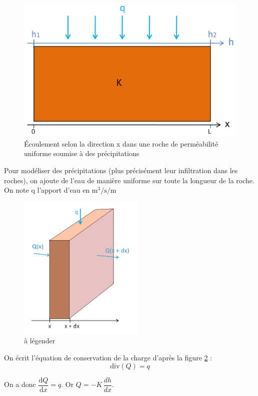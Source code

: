 \documentclass{article}
\begin{document}
\begin{figure}[H]
    \centering
    \includegraphics[width=13cm]{A_III_B_3.png}
    \caption{Écoulement selon la direction x dans une roche de perméabilité uniforme soumise à des précipitations}
    \label{fig:ecoulement_précipitations}
\end{figure}
\newpage
Pour modéliser des précipitations (plus précisément leur infiltration dans les roches), on ajoute de l’eau de manière uniforme sur toute la longueur de la roche. On note q l’apport d’eau en $\text{m}^3/\text{s}/\text{m}$

\begin{figure}[H]
    \centering
    \includegraphics[width=6cm]{A_III_B_4.png}
    \caption{à légender}
    \label{fig:schema_carre_ecoulement}%
\end{figure}


On écrit l’équation de conservation de la charge d'après la figure \ref{fig:schema_carre_ecoulement} :
$$ \text{div} (Q)=q$$

On a donc $\dfrac{\text{d}Q}{\text{d}x}=q$.
Or $Q= -K\, \dfrac{dh}{dx}$.
\end{document}
